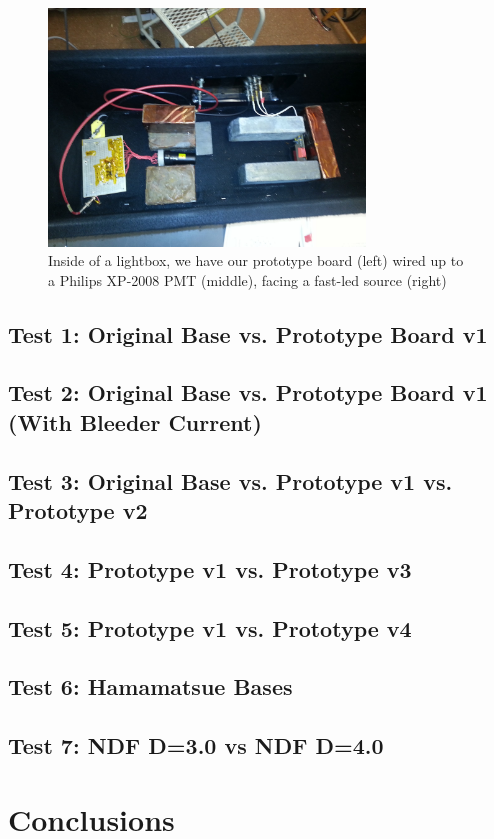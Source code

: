 \documentclass[11pt]{article}
\begin{document}
\begin{figure}[h]
    \centerline{
    \mbox{\includegraphics[width=0.75\textwidth]{setup.jpg}}
    }
    \caption{Inside of a lightbox, we have our prototype board (left) wired up to a Philips XP-2008 PMT (middle), facing a fast-led source (right) }
    \label{fig:setup}
\end{figure}

\subsection{Test 1: Original Base vs. Prototype Board v1}


\subsection{Test 2: Original Base vs. Prototype Board v1 (With Bleeder Current)}


\subsection{Test 3: Original Base vs. Prototype v1 vs. Prototype v2}


\subsection{Test 4: Prototype v1 vs. Prototype v3}


\subsection{Test 5: Prototype v1 vs. Prototype v4}


\subsection{Test 6: Hamamatsue Bases}

\subsection{Test 7: NDF D=3.0 vs NDF D=4.0}


\section{Conclusions}


\bigskip


\end{document}
